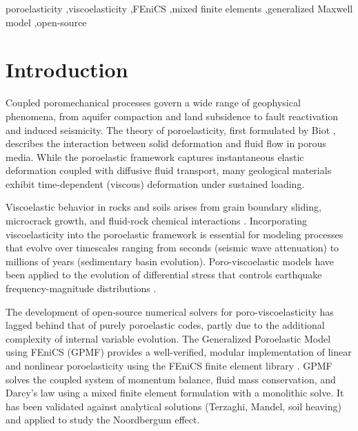 \documentclass[a4paper,fleqn,longmktitle]{cas-sc}
\begin{document}
\begin{keywords}
poroelasticity \sep viscoelasticity \sep FEniCS \sep mixed finite elements
\sep generalized Maxwell model \sep open-source
\end{keywords}

\maketitle

\printcredits

\doublespacing

\linenumbers

\section{Introduction}
\label{sec:introduction}

Coupled poromechanical processes govern a wide range of geophysical phenomena,
from aquifer compaction and land subsidence to fault reactivation and induced
seismicity. The theory of poroelasticity, first formulated by Biot
\citeyearpar{Biot1941}, describes the interaction between solid deformation and fluid
flow in porous media. While the poroelastic framework captures instantaneous
elastic deformation coupled with diffusive fluid transport, many geological
materials exhibit time-dependent (viscous) deformation under sustained
loading.

Viscoelastic behavior in rocks and soils arises from grain boundary sliding,
microcrack growth, and fluid-rock chemical interactions \citep{Jaeger2007}.
Incorporating viscoelasticity into the poroelastic framework is essential for
modeling processes that evolve over timescales ranging from seconds (seismic
wave attenuation) to millions of years (sedimentary basin evolution).
Poro-viscoelastic models have been applied to the evolution of differential
stress that controls earthquake frequency-magnitude distributions
\citep{Scholz1968, GuliaWiemer2019}.

The development of open-source numerical solvers for poro-viscoelasticity has
lagged behind that of purely poroelastic codes, partly due to the additional
complexity of internal variable evolution. The Generalized Poroelastic Model
using FEniCS (GPMF) \citep{Haagenson2020} provides a well-verified, modular
implementation of linear and nonlinear poroelasticity using the FEniCS finite
element library \citep{Logg2012, Alnass2015}. GPMF solves the coupled system
of momentum balance, fluid mass conservation, and Darcy's law using a mixed
finite element formulation with a monolithic solve. It has been validated
against analytical solutions (Terzaghi, Mandel, soil heaving) and applied to
study the Noordbergum effect.
\end{document}

